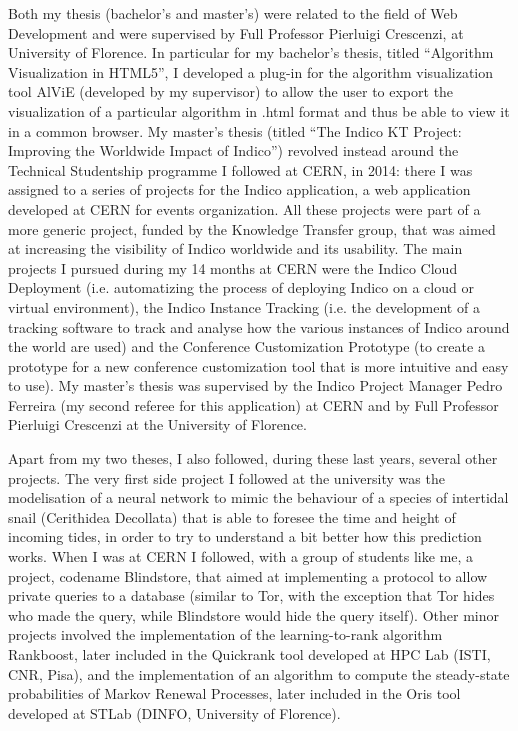 \documentclass{article}
\begin{document}
    Both my thesis (bachelor's and master's) were related to the field of Web Development and were supervised by Full Professor Pierluigi Crescenzi, at University of Florence. In particular for my bachelor's thesis, titled ``Algorithm Visualization in HTML5'', I developed a plug-in for the algorithm visualization tool AlViE (developed by my supervisor) to allow the user to export the visualization of a particular algorithm in .html format and thus be able to view it in a common browser. My master's thesis (titled ``The Indico KT Project: Improving the Worldwide Impact of Indico'') revolved instead around the Technical Studentship programme I followed at CERN, in 2014: there I was assigned to a series of projects for the Indico application, a web application developed at CERN for events organization. All these projects were part of a more generic project, funded by the Knowledge Transfer group, that was aimed at increasing the visibility of Indico worldwide and its usability. The main projects I pursued during my 14 months at CERN were the Indico Cloud Deployment (i.e. automatizing the process of deploying Indico on a cloud or virtual environment), the Indico Instance Tracking (i.e. the development of a tracking software to track and analyse how the various instances of Indico around the world are used) and the Conference Customization Prototype (to create a prototype for a new conference customization tool that is more intuitive and easy to use). My master's thesis was supervised by the Indico Project Manager Pedro Ferreira (my second referee for this application) at CERN and by Full Professor Pierluigi Crescenzi at the University of Florence. \par \bigskip
    
    Apart from my two theses, I also followed, during these last years, several other projects. The very first side project I followed at the university was the modelisation of a neural network to mimic the behaviour of a species of intertidal snail (Cerithidea Decollata) that is able to foresee the time and height of incoming tides, in order to try to understand a bit better how this prediction works. When I was at CERN I followed, with a group of students like me, a project, codename Blindstore, that aimed at implementing a protocol to allow private queries to a database (similar to Tor, with the exception that Tor hides who made the query, while Blindstore would hide the query itself). Other minor projects involved the implementation of the learning-to-rank algorithm Rankboost, later included in the Quickrank tool developed at HPC Lab (ISTI, CNR, Pisa), and the implementation of an algorithm to compute the steady-state probabilities of Markov Renewal Processes, later included in the Oris tool developed at STLab (DINFO, University of Florence). \par \bigskip
    
\end{document}
